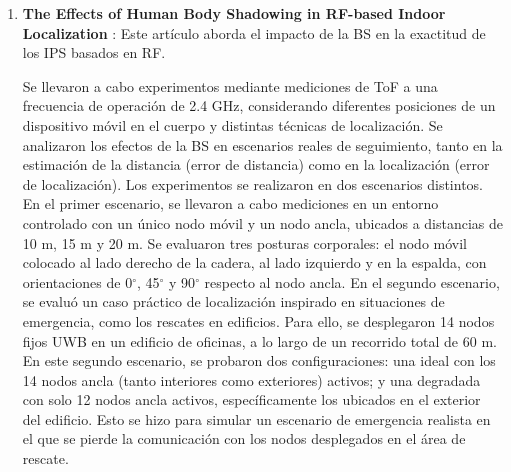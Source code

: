 \begin{enumerate}
    Los autores concluyen que, aunque la obstrucción causada por BS atenúa significativamente la señal LOS, esta condición no genera errores adicionales en la estimación de distancia, siempre que el TOA se detecte correctamente a partir de las trayectorias difractadas. El estudio demuestra que una selección adecuada del umbral de detección permite minimizar el error de estimación incluso en presencia de BS. No obstante, en escenarios con baja Relación Señal a Ruido (SNR, \textit{Signal-to-Noise Ratio}), la pérdida del componente directo de  la señal por parte de la BS puede degradar la exactitud del sistema. Finalmente, los autores recomiendan que futuras investigaciones consideren configuraciones dinámicas, en las cuales el movimiento del usuario pueda modificar las condiciones de canal para la propagación de la señal en tiempo real.

    \item \textbf{The Effects of Human Body Shadowing in RF-based Indoor Localization} \cite{Schimtt2019}: Este artículo aborda el impacto de la BS en la exactitud de los IPS basados en RF. 
    
    Se llevaron a cabo experimentos mediante mediciones de ToF a una frecuencia de operación de 2.4 GHz, considerando diferentes posiciones de un dispositivo móvil en el cuerpo y distintas técnicas de localización. Se analizaron los efectos de la BS en escenarios reales de seguimiento, tanto en la estimación de la distancia (error de distancia) como en la localización (error de localización). Los experimentos se realizaron en dos escenarios distintos. En el primer escenario, se llevaron a cabo mediciones en un entorno controlado con un único nodo móvil y un nodo ancla, ubicados a distancias de 10 m, 15 m y 20 m. Se evaluaron tres posturas corporales: el nodo móvil colocado al lado derecho de la cadera, al lado izquierdo y en la espalda, con orientaciones de 0$^\circ$, 45$^\circ$ y 90$^\circ$ respecto al nodo ancla. En el segundo escenario, se evaluó un caso práctico de localización inspirado en situaciones de emergencia, como los rescates en edificios. Para ello, se desplegaron 14 nodos fijos UWB en un edificio de oficinas, a lo largo de un recorrido total de 60 m. En este segundo escenario, se probaron dos configuraciones: una ideal con los 14 nodos ancla (tanto interiores como exteriores) activos; y una degradada con solo 12 nodos ancla activos, específicamente los ubicados en el exterior del edificio. Esto se hizo para simular un escenario de emergencia realista en el que se pierde la comunicación con los nodos desplegados en el área de rescate.


\end{enumerate}
